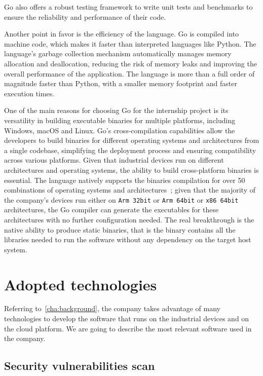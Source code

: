 Go also offers a robust testing framework to write unit tests and benchmarks to ensure the reliability and performance of their code.

Another point in favor is the efficiency of the language. Go is compiled into machine code, which makes it faster than interpreted languages like Python. The language's garbage collection mechanism automatically manages memory allocation and deallocation, reducing the risk of memory leaks and improving the overall performance of the application. The language is more than a full order of magnitude faster than Python, with a smaller memory footprint and faster execution times.~\cite{go-lang-performance}

One of the main reasons for choosing Go for the internship project is its versatility in building executable binaries for multiple platforms, including Windows, macOS and Linux. Go's cross-compilation capabilities allow the developers to build binaries for different operating systems and architectures from a single codebase, simplifying the deployment process and ensuring compatibility across various platforms. Given that industrial devices run on different architectures and operating systems, the ability to build cross-platform binaries is essential. The language natively supports the binaries compilation for over 50 combinations of operating systems and architectures~\cite{go-lang-compilation-combo}; given that the majority of the company's devices run either on \texttt{Arm 32bit} or \texttt{Arm 64bit} or \texttt{x86 64bit} architectures, the Go compiler can generate the executables for these architectures with no further configuration needed. The real breakthrough is the native ability to produce static binaries, that is the binary contains all the libraries needed to run the software without any dependency on the target host system.

\section{Adopted technologies}

Referring to~\cref{cha:background}, the company takes advantage of many technologies to develop the software that runs on the industrial devices and on the cloud platform. We are going to describe the most relevant software used in the company.

\subsection{Security vulnerabilities scan}

